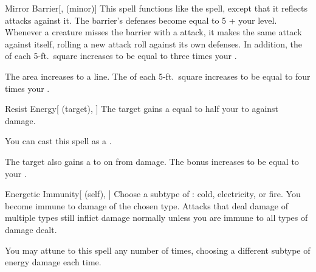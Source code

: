 \lowercase{\hypertarget{spell:Mirror Barrier}{}}\label{spell:Mirror Barrier}
\begin{freeability}[Rank 4]{\hypertarget{spell:Mirror Barrier}{Mirror Barrier}}[,  (minor)]
\targetrule
This spell functions like the  spell, except that it reflects  attacks against it.
The barrier's defenses become equal to 5 + your level.
Whenever a creature misses the barrier with a  attack, it makes the same attack against itself, rolling a new attack roll against its own defenses.
In addition, the  of each 5-ft.\ square increases to be equal to three times your .

 The area increases to a \arealarge line.
 The  of each 5-ft.\ square increases to be equal to four times your .
\end{freeability}
\vspace{0.25em}



\lowercase{\hypertarget{spell:Resist Energy}{}}\label{spell:Resist Energy}
\begin{attuneability}[Rank 4]{\hypertarget{spell:Resist Energy}{Resist Energy}}[ (target), ]
The target gains a  equal to half your  to  against  damage.

You can cast this spell as a .

\rankline
{} The target also gains a   to  on  from  damage.
 The bonus increases to be equal to your .
\end{attuneability}
\vspace{0.25em}



\lowercase{\hypertarget{spell:Energetic Immunity}{}}\label{spell:Energetic Immunity}
\begin{attuneability}[Rank 5]{\hypertarget{spell:Energetic Immunity}{Energetic Immunity}}[ (self), ]
Choose a subtype of : cold, electricity, or fire.
You become immune to damage of the chosen type.
Attacks that deal damage of multiple types still inflict damage normally unless you are immune to all types of damage dealt.

\rankline
{} You may attune to this spell any number of times, choosing a different subtype of energy damage each time.
\end{attuneability}
\vspace{0.25em}



